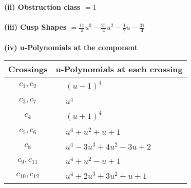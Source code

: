 \documentclass[1p]{elsarticle_modified}
\theoremstyle{definition}
\begin{document}
\flushleft \textbf{(ii) Obstruction class $= 1$}\\~\\
\flushleft \textbf{(iii) Cusp Shapes $= \frac{11}{4} u^3-\frac{21}{4} u^2-\frac{1}{2} u-\frac{31}{4}$}\\~\\
\newpage\renewcommand{\arraystretch}{1}
\flushleft \textbf{(iv) u-Polynomials at the component}\newline \\
\begin{tabular}{m{50pt}|m{274pt}}
Crossings & \hspace{64pt}u-Polynomials at each crossing \\
\hline $$\begin{aligned}c_{1},c_{2}\end{aligned}$$&$\begin{aligned}
&(u-1)^4
\end{aligned}$\\
\hline $$\begin{aligned}c_{3},c_{7}\end{aligned}$$&$\begin{aligned}
&u^4
\end{aligned}$\\
\hline $$\begin{aligned}c_{4}\end{aligned}$$&$\begin{aligned}
&(u+1)^4
\end{aligned}$\\
\hline $$\begin{aligned}c_{5},c_{6}\end{aligned}$$&$\begin{aligned}
&u^4+u^2+u+1
\end{aligned}$\\
\hline $$\begin{aligned}c_{8}\end{aligned}$$&$\begin{aligned}
&u^4-3 u^3+4 u^2-3 u+2
\end{aligned}$\\
\hline $$\begin{aligned}c_{9},c_{11}\end{aligned}$$&$\begin{aligned}
&u^4+u^2- u+1
\end{aligned}$\\
\hline $$\begin{aligned}c_{10},c_{12}\end{aligned}$$&$\begin{aligned}
&u^4+2 u^3+3 u^2+u+1
\end{aligned}$\\
\hline
\end{tabular}\\~\\
\end{document}
